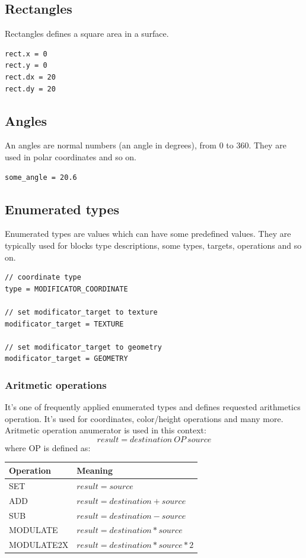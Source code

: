 \documentclass[9pt]{article}
\begin{document}
\subsection{Rectangles}

Rectangles defines a square area in a surface.
\begin{verbatim}
rect.x = 0
rect.y = 0
rect.dx = 20
rect.dy = 20
\end{verbatim}

\subsection{Angles}

An angles are normal numbers (an angle in degrees), from 0 to 360. 
They are used in polar coordinates and so on.
\begin{verbatim}
some_angle = 20.6
\end{verbatim}

\subsection{Enumerated types}

Enumerated types are values which can have some predefined values. 
They are typically used for blocks type descriptions, some types,
targets, operations and so on.
\begin{verbatim}
// coordinate type
type = MODIFICATOR_COORDINATE

// set modificator_target to texture
modificator_target = TEXTURE

// set modificator_target to geometry
modificator_target = GEOMETRY
\end{verbatim}

\subsubsection{Aritmetic operations}
It's one of frequently applied enumerated types and defines requested arithmetics
operation. It's used for coordinates, color/height operations and many more. Aritmetic 
operation anumerator is used in this context: 
\[
result = destination~OP~source
\]
where OP is defined as:

\begin{center}
  \begin{tabular}{|l||l|}
  \hline
  Operation & Meaning \\
  \hline
  \hline
  SET & \(result = source\) \\
  ADD & \(result = destination + source\) \\
  SUB & \(result = destination - source\) \\
  MODULATE & \(result = destination * source\) \\
  MODULATE2X & \(result = destination * source * 2\) \\
  \hline
  \end{tabular}
\end{center}
\end{document}
